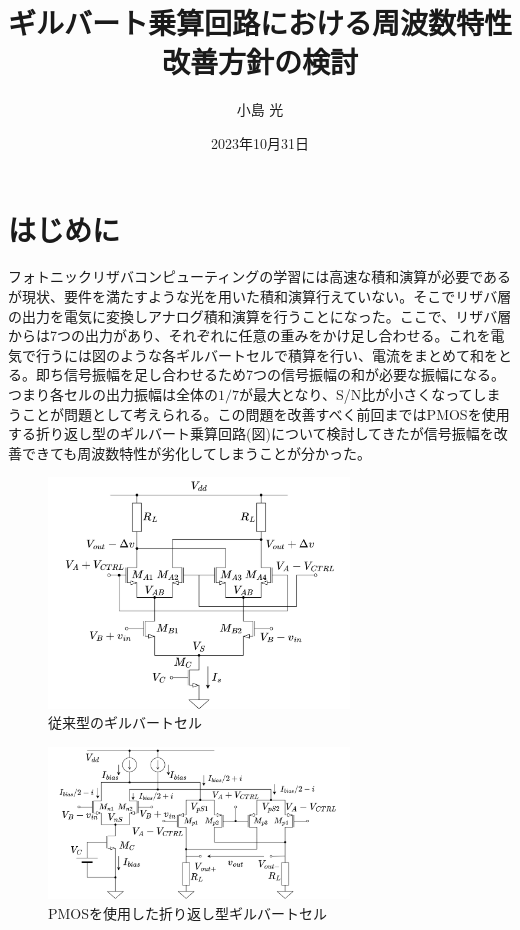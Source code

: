 \documentclass[twocolumn]{jsarticle}
\begin{document}
\title{ギルバート乗算回路における周波数特性改善方針の検討}
\author{小島 光}
\date{2023年10月31日}
\maketitle

\section{はじめに}
    フォトニックリザバコンピューティングの学習には高速な積和演算が必要であるが現状、要件を満たすような光を用いた積和演算行えていない。そこでリザバ層の出力を電気に変換しアナログ積和演算を行うことになった。ここで、リザバ層からは7つの出力があり、それぞれに任意の重みをかけ足し合わせる。これを電気で行うには図のような各ギルバートセルで積算を行い、電流をまとめて和をとる。即ち信号振幅を足し合わせるため7つの信号振幅の和が必要な振幅になる。つまり各セルの出力振幅は全体の$1/7$が最大となり、S/N比が小さくなってしまうことが問題として考えられる。この問題を改善すべく前回まではPMOSを使用する折り返し型のギルバート乗算回路(図)について検討してきたが信号振幅を改善できても周波数特性が劣化してしまうことが分かった。
    \begin{figure}[h]
        \begin{center}
            \includegraphics*[width=80mm]{figures/gilbert.png}
            \caption{従来型のギルバートセル}
            \label{fig:gilbert_conv}
        \end{center}
    \end{figure}
    \begin{figure}[H]
            \includegraphics*[width=80mm]{figures/folded_gilbert.png}
            \caption{PMOSを使用した折り返し型ギルバートセル}
            \label{fig:gilbert_folded_NtoP}
    \end{figure}
\end{document}
